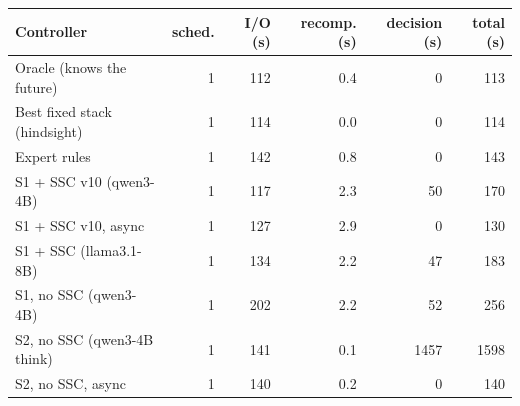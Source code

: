 \begin{tabular}{lrrrrr}
\toprule
Controller & sched. & I/O (s) & recomp. (s) & decision (s) & total (s) \\
\midrule
Oracle (knows the future) & 1 & 112 & 0.4 & 0 & 113 \\
Best fixed stack (hindsight) & 1 & 114 & 0.0 & 0 & 114 \\
Expert rules & 1 & 142 & 0.8 & 0 & 143 \\
S1 + SSC v10 (qwen3-4B) & 1 & 117 & 2.3 & 50 & 170 \\
S1 + SSC v10, async & 1 & 127 & 2.9 & 0 & 130 \\
S1 + SSC (llama3.1-8B) & 1 & 134 & 2.2 & 47 & 183 \\
S1, no SSC (qwen3-4B) & 1 & 202 & 2.2 & 52 & 256 \\
S2, no SSC (qwen3-4B think) & 1 & 141 & 0.1 & 1457 & 1598 \\
S2, no SSC, async & 1 & 140 & 0.2 & 0 & 140 \\
\bottomrule
\end{tabular}
